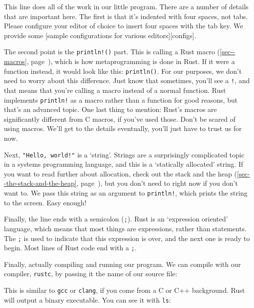 \documentclass[a4paper,]{book}
\renewcommand*{\hyperref}[2][\ar]{%
  \def\ar{#2}%
  #2 (\autoref{#1}, page~\pageref{#1})}
\newenvironment{Shaded}{\begin{snugshade}}{\end{snugshade}}
\newcommand{\KeywordTok}[1]{\textcolor[rgb]{0.13,0.29,0.53}{\textbf{{#1}}}}
\newcommand{\NormalTok}[1]{{#1}}
\begin{document}
This line does all of the work in our little program. There are a number
of details that are important here. The first is that it's indented with
four spaces, not tabs. Please configure your editor of choice to insert
four spaces with the tab key. We provide some {[}sample configurations
for various editors{]}{[}configs{]}.

The second point is the \texttt{println!()} part. This is calling a Rust
\hyperref[sec--macros]{macro}, which is how metaprogramming is done in
Rust. If it were a function instead, it would look like this:
\texttt{println()}. For our purposes, we don't need to worry about this
difference. Just know that sometimes, you'll see a \texttt{!}, and that
means that you're calling a macro instead of a normal function. Rust
implements \texttt{println!} as a macro rather than a function for good
reasons, but that's an advanced topic. One last thing to mention: Rust's
macros are significantly different from C macros, if you've used those.
Don't be scared of using macros. We'll get to the details eventually,
you'll just have to trust us for now.

Next, \texttt{"Hello,\ world!"} is a `string'. Strings are a
surprisingly complicated topic in a systems programming language, and
this is a `statically allocated' string. If you want to read further
about allocation, check out \hyperref[sec--the-stack-and-the-heap]{the
stack and the heap}, but you don't need to right now if you don't want
to. We pass this string as an argument to \texttt{println!}, which
prints the string to the screen. Easy enough!

Finally, the line ends with a semicolon (\texttt{;}). Rust is an
`expression oriented' language, which means that most things are
expressions, rather than statements. The \texttt{;} is used to indicate
that this expression is over, and the next one is ready to begin. Most
lines of Rust code end with a \texttt{;}.

Finally, actually compiling and running our program. We can compile with
our compiler, \texttt{rustc}, by passing it the name of our source file:

\begin{Shaded}
\end{Shaded}

This is similar to \texttt{gcc} or \texttt{clang}, if you come from a C
or C++ background. Rust will output a binary executable. You can see it
with \texttt{ls}:
\end{document}
